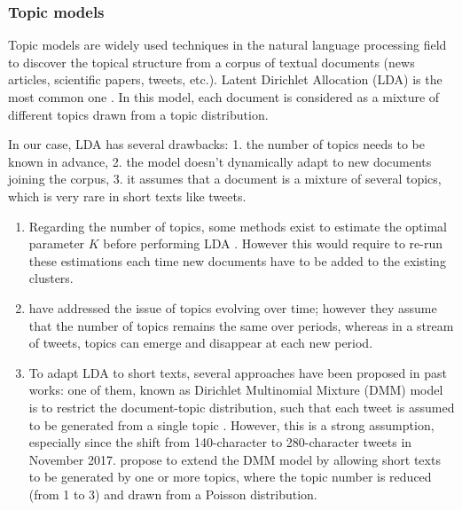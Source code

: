 		\subsubsection{Topic models} Topic models are widely used techniques in the natural language processing field to discover the topical structure from a corpus of textual documents (news articles, scientific papers, tweets, etc.). Latent Dirichlet Allocation (LDA) is the most common one \citep{blei_latent_2003}. In this model, each document is considered as a mixture of different topics drawn from a topic distribution. 
	
	In our case, LDA has several drawbacks: 1. the number of topics needs to be known in advance, 2. the model doesn't dynamically adapt to new documents joining the corpus, 3. it assumes that a document is a mixture of several topics, which is very rare in short texts like tweets.
	
	\begin{enumerate}
	 \item Regarding the number of topics, some methods exist to estimate the optimal parameter $K$ before performing LDA \citep{brunet_metagenes_2004,arun_finding_2010,greene_how_2014}. However this would require to re-run these estimations each time new documents have to be added to the existing clusters.
	 \item \cite{blei_dynamic_2006} have addressed the issue of topics evolving over time; however they assume that the number of topics remains the same over periods, whereas in a stream of tweets, topics can emerge and disappear at each new period.
	 \item To adapt LDA to short texts, several approaches have been proposed in past works: one of them, known as Dirichlet Multinomial Mixture (DMM) model is to restrict the document-topic distribution, such that each tweet is assumed to be generated from a single topic \citep{yin_dirichlet_2014}. However, this is a strong assumption, especially since the shift from 140-character to 280-character tweets in November 2017. \citet{li_enhancing_2017} propose to extend the DMM model by allowing short texts to be generated by one or more topics, where the topic number is reduced (from 1 to 3) and drawn from a Poisson distribution.
	\end{enumerate}


